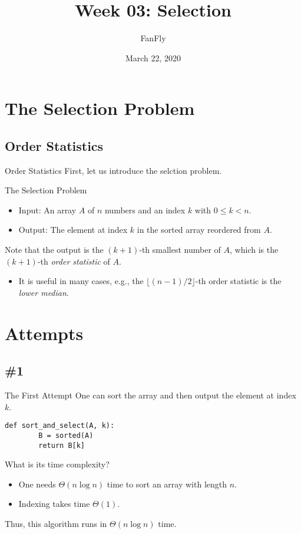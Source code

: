 \documentclass{beamer}
\title{Week 03: Selection}
\author{FanFly}
\date{March 22, 2020}
\begin{document}
\begin{frame}
  \titlepage
\end{frame}

\section{The Selection Problem}
\subsection{Order Statistics}
\begin{frame}{Order Statistics}
  First, let us introduce the selction problem. \pause
  \begin{block}{The Selection Problem}
    \begin{itemize}
      \item Input: An array $A$ of $n$ numbers and an index $k$ with
      $0 \leq k < n$.
      \item Output: The element at index $k$ in the sorted array reordered
      from $A$. \pause
    \end{itemize}
  \end{block}
  Note that the output is the $(k+1)$-th smallest number of $A$, which is the
  $(k+1)$-th \emph{order statistic} of $A$. \pause
  \begin{itemize}
    \item It is useful in many cases, e.g., the $\lfloor(n-1)/2\rfloor$-th
    order statistic is the \emph{lower median}.
  \end{itemize}
\end{frame}

\section{Attempts}
\subsection{\#1}
\begin{frame}[fragile]{The First Attempt}
  One can sort the array and then output the element at index $k$.
  \begin{block}{}
    \scriptsize
    \begin{lstlisting}[gobble=4]
    def sort_and_select(A, k):
        B = sorted(A)
        return B[k]
    \end{lstlisting}
    \pause
  \end{block}
  What is its time complexity? \pause
  \begin{itemize}
    \item One needs $\Theta(n \log n)$ time to sort an array with length $n$.
    \pause
    \item Indexing takes time $\Theta(1)$. \pause
  \end{itemize}
  Thus, this algorithm runs in $\Theta(n \log n)$ time.
\end{frame}
\end{document}
